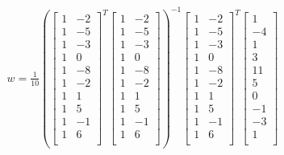 \documentclass[12pt]{article}
\begin{document}
\begin{enumerate}
\begin{enumerate}
	\begin{equation}
	\begin{split}
		w = \frac{1}{10} (\begin{bmatrix}
			1 & -2\\
			1 & -5\\	
			1 & -3\\
			1 & 0\\
			1 & -8\\
			1 & -2\\
			1 & 1\\
			1 & 5\\
			1 & -1\\
			1 & 6\\
		\end{bmatrix}^{T}\begin{bmatrix}
			1 & -2\\
			1 & -5\\	
			1 & -3\\
			1 & 0\\
			1 & -8\\
			1 & -2\\
			1 & 1\\
			1 & 5\\
			1 & -1\\
			1 & 6\\
		\end{bmatrix})^{-1}\begin{bmatrix}
			1 & -2\\
			1 & -5\\	
			1 & -3\\
			1 & 0\\
			1 & -8\\
			1 & -2\\
			1 & 1\\
			1 & 5\\
			1 & -1\\
			1 & 6\\
		\end{bmatrix}^{T}\begin{bmatrix}
			1\\
			-4\\	
			1\\
			3\\
			11\\
			5\\
			0\\
			-1\\
			-3\\
			1\\
			\end{bmatrix}
		\end{split}
	\end{equation}


\end{enumerate}
\end{enumerate}
\end{document}
